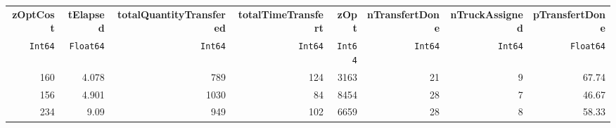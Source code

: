 \begin{tabular}{rrrrrrrr}
  \hline
  \textbf{zOptCost} & \textbf{tElapsed} & \textbf{totalQuantityTransfered} & \textbf{totalTimeTransfert} & \textbf{zOpt} & \textbf{nTransfertDone} & \textbf{nTruckAssigned} & \textbf{pTransfertDone} \\
  \texttt{Int64} & \texttt{Float64} & \texttt{Int64} & \texttt{Int64} & \texttt{Int64} & \texttt{Int64} & \texttt{Int64} & \texttt{Float64} \\\hline
  160 & 4.078 & 789 & 124 & 3163 & 21 & 9 & 67.74 \\
  156 & 4.901 & 1030 & 84 & 8454 & 28 & 7 & 46.67 \\
  234 & 9.09 & 949 & 102 & 6659 & 28 & 8 & 58.33 \\\hline
\end{tabular}
